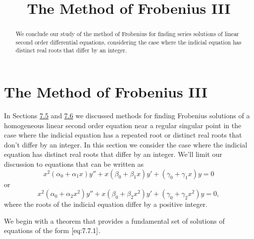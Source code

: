\documentclass{ximera}
\title{The Method of Frobenius III}%
\begin{document}
\begin{abstract}
We conclude our study of the method of Frobenius for finding series solutions of linear second order differential equations, considering the case where the indicial equation has distinct real roots that differ by an integer.
\end{abstract}

\maketitle

\section*{The Method of Frobenius III}

In Sections \href{https://xerxes.ximera.org/differentialequations/main/frobeniusI/frobeniusI}{7.5} and \href{https://xerxes.ximera.org/differentialequations/main/frobeniusII/frobeniusII}{7.6} we discussed methods
for finding
Frobenius solutions of a homogeneous linear second order equation near
a regular singular point in the case where the indicial equation has a
repeated root or distinct real roots that don't differ by an integer.
In this section we consider the case where the indicial equation has
distinct real roots that differ by an integer. We'll limit our
discussion to equations that can be written as
\begin{equation} \label{eq:7.7.1}
x^2(\alpha_0+\alpha_1x)y''+x(\beta_0+\beta_1x)y'
+(\gamma_0+\gamma_1x)y=0
\end{equation}
or
$$
x^2(\alpha_0+\alpha_2x^2)y''+x(\beta_0+\beta_2x^2)y'
+(\gamma_0+\gamma_2x^2)y=0,
$$
where the roots of the indicial equation differ by a positive integer.

We begin with a theorem that provides a fundamental set of solutions of equations of the form $\eqref{eq:7.7.1}$.
\end{document}
